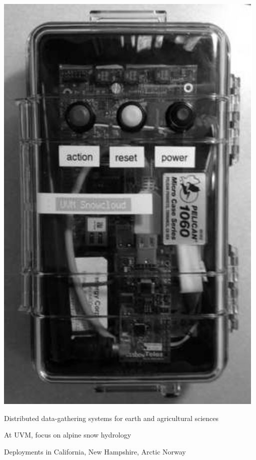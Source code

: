 \begin{center}
\includegraphics[scale=.50]{Figures/harvester.pdf}
\end{center}

\begin{citemize}
\item Distributed data-gathering systems for earth and agricultural sciences
\item At UVM, focus on alpine snow hydrology
\begin{citemize}
\item Deployments in California, New Hampshire, Arctic Norway
\end{citemize}
\end{citemize}
\stopslide

